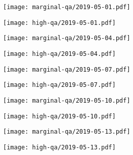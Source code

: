 \documentclass{article}
\begin{document}
\begin{figure}[H]
	\ContinuedFloat
	\centering
	\begin{subfigure}{0.48\linewidth}
		\texttt{[image: marginal-qa/2019-05-01.pdf]}
	\end{subfigure}
	\begin{subfigure}{0.48\linewidth}
		\texttt{[image: high-qa/2019-05-01.pdf]}
	\end{subfigure}
	\begin{subfigure}{0.48\linewidth}
		\texttt{[image: marginal-qa/2019-05-04.pdf]}
	\end{subfigure}
	\begin{subfigure}{0.48\linewidth}
		\texttt{[image: high-qa/2019-05-04.pdf]}
	\end{subfigure}
	\begin{subfigure}{0.48\linewidth}
		\texttt{[image: marginal-qa/2019-05-07.pdf]}
	\end{subfigure}
	\begin{subfigure}{0.48\linewidth}
		\texttt{[image: high-qa/2019-05-07.pdf]}
	\end{subfigure}
	\begin{subfigure}{0.48\linewidth}
		\texttt{[image: marginal-qa/2019-05-10.pdf]}
	\end{subfigure}
	\begin{subfigure}{0.48\linewidth}
		\texttt{[image: high-qa/2019-05-10.pdf]}
	\end{subfigure}
	\begin{subfigure}{0.48\linewidth}
		\texttt{[image: marginal-qa/2019-05-13.pdf]}
	\end{subfigure}
	\begin{subfigure}{0.48\linewidth}
		\texttt{[image: high-qa/2019-05-13.pdf]}
	\end{subfigure}
\end{figure}
\end{document}
